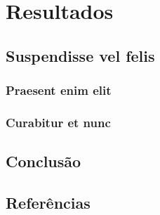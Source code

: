 \documentclass[
	12pt,				%
    oneside,            %
	a4paper,			%
	english,			%
	brazilian,		    %
	]{AcademicoUFT}
\begin{document}
\part{Resultados}

\chapter{Suspendisse vel felis}

\section{Praesent enim elit}
\lipsum[6-7] %

\section{Curabitur et nunc}
\lipsum[8-10] %




\chapter{Conclusão}
\lipsum[31-33] %


\postextual


\chapter*{Referências}                                               %
\printbibliography[heading=none]                                     %
\end{document}
